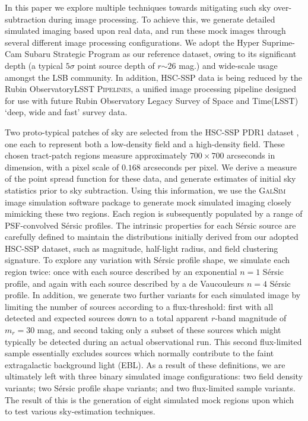 \documentclass[fleqn,usenatbib,useAMS]{mnras}
\newcommand*{\about}{\mathord\sim}
\newcommand*{\Sersic}{S\'{e}rsic\xspace}
\newcommand*{\GalSim}{\textsc{GalSim}\xspace}
\newcommand*{\LSSTPs}{\textsc{LSST Pipelines}\xspace}
\newcommand*{\RO}{Rubin Observatory\xspace}
\newcommand*{\LSST}{Legacy Survey of Space and Time\xspace}
\begin{document}
In this paper we explore multiple techniques towards mitigating such sky over-subtraction during image processing. To achieve this, we generate detailed simulated imaging based upon real data, and run these mock images through several different image processing configurations. We adopt the Hyper Suprime-Cam Subaru Strategic Program \citep[HSC-SSP,][]{Miyazaki2012,Miyazaki2018,Aihara2018a} as our reference dataset, owing to its significant depth (a typical $5\sigma$ point source depth of $r\about26$ mag.) and wide-scale usage amongst the LSB community. In addition, HSC-SSP data is being reduced by the \RO \LSSTPs \citep{Juric2017,Bosch2018,Huang2018}, a unified image processing pipeline designed for use with future \RO \LSST (LSST) `deep, wide and fast' survey data. 

Two proto-typical patches of sky are selected from the HSC-SSP PDR1 dataset \citep{Aihara2018b}, one each to represent both a low-density field and a high-density field. These chosen tract-patch regions measure approximately $700\times700$ arcseconds in dimension, with a pixel scale of $0.168$ arcseconds per pixel. We derive a measure of the point spread function for these data, and generate estimates of initial sky statistics prior to sky subtraction. Using this information, we use the \GalSim image simulation software package \citep{Rowe2015} to generate mock simulated imaging closely mimicking these two regions. Each region is subsequently populated by a range of PSF-convolved \Sersic profiles. The intrinsic properties for each \Sersic source are carefully defined to maintain the distributions initially derived from our adopted HSC-SSP dataset, such as magnitude, half-light radius, and field clustering signature. To explore any variation with \Sersic profile shape, we simulate each region twice: once with each source described by an exponential $n=1$ \Sersic profile, and again with each source described by a de Vaucouleurs $n=4$ \Sersic profile. In addition, we generate two further variants for each simulated image by limiting the number of sources according to a flux-threshold: first with all detected and expected sources down to a total apparent $r$-band magnitude of $m_r=30$ mag, and second taking only a subset of these sources which might typically be detected during an actual observational run. This second flux-limited sample essentially excludes sources which normally contribute to the faint extragalactic background light (EBL). As a result of these definitions, we are ultimately left with three binary simulated image configurations: two field density variants; two \Sersic profile shape variants; and two flux-limited sample variants. The result of this is the generation of eight simulated mock regions upon which to test various sky-estimation techniques. 
\end{document}
